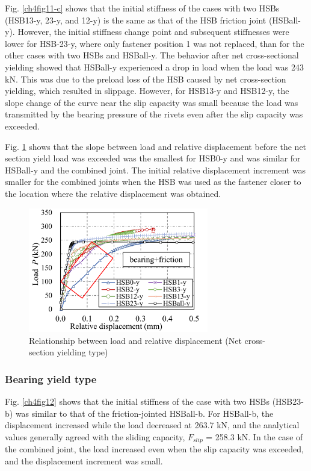 Fig. \ref{ch4fig11-c} shows that the initial stiffness of the cases with two \ac{HSB}s (HSB13-y, 23-y, and 12-y) is the same as that of the HSB friction joint (HSBall-y). However, the initial stiffness change point and subsequent stiffnesses were lower for HSB-23-y, where only fastener position 1 was not replaced, than for the other cases with two \ac{HSB}s and HSBall-y. The behavior after net cross-sectional yielding showed that HSBall-y experienced a drop in load when the load was 243 kN. This was due to the preload loss of the \ac{HSB} caused by net cross-section yielding, which resulted in slippage. However, for HSB13-y and HSB12-y, the slope change of the curve near the slip capacity was small because the load was transmitted by the bearing pressure of the rivets even after the slip capacity was exceeded.

Fig. \ref{ch4fig13} shows that the slope between load and relative displacement before the net section yield load was exceeded was the smallest for HSB0-y and was similar for HSBall-y and the combined joint. The initial relative displacement increment was smaller for the combined joints when the \ac{HSB} was used as the fastener closer to the location where the relative displacement was obtained.

\begin{figure}[htbp]
    \centering
    \includegraphics[width=0.7\textwidth]{imgs/ch4/fig13.pdf}
    \caption{Relationship between load and relative displacement (Net cross-section yielding type)}
    \label{ch4fig13}
\end{figure}

\subsubsection{Bearing yield type}

Fig. \ref{ch4fig12} shows that the initial stiffness of the case with two \ac{HSB}s (HSB23-b) was similar to that of the friction-jointed HSBall-b. For HSBall-b, the displacement increased while the load decreased at 263.7 kN, and the analytical values generally agreed with the sliding capacity, $F_{slip}$  = 258.3 kN. In the case of the combined joint, the load increased even when the slip capacity was exceeded, and the displacement increment was small.

